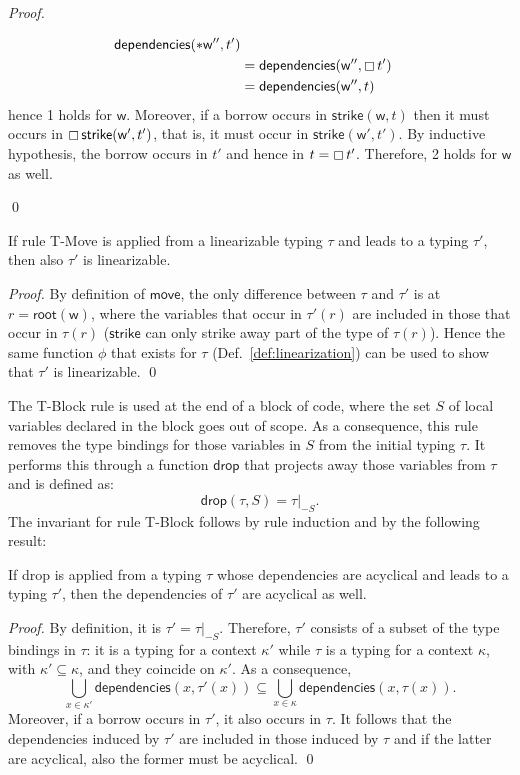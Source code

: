 \begin{proof}
\begin{itemize}
\begin{align*}
      \mathsf{dependencies}(\mathtt{*}\mathsf{w}'',t')\\
      &=\mathsf{dependencies}(\mathsf{w}'',\boxempty\,{t'})\\
      &=\mathsf{dependencies}(\mathsf{w}'',t)
    \end{align*}
    hence 1 holds for $\mathsf{w}$. Moreover, if a borrow occurs in
    $\mathsf{strike}(\mathsf{w},t)$ then it must occurs
    in $\boxempty\,{\mathsf{strike}(\mathsf{w}',t')}$, that is, it must occur in
    $\mathsf{strike}(\mathsf{w}',t')$. By inductive hypothesis, the borrow
    occurs in $t'$ and hence in $t=\boxempty\,{t'}$. Therefore, 2 holds for
    $\mathsf{w}$ as well.
  \end{itemize}
  \qed
\end{proof}

\begin{lemma}\label{lem:move_invariant}
  If rule \textsf{T-Move} is applied from a linearizable typing $\tau$
  and leads to a typing $\tau'$, then also $\tau'$ is linearizable.
\end{lemma}
\begin{proof}
  By definition of $\mathsf{move}$, the only
  difference between $\tau$ and $\tau'$ is at $r=\mathsf{root}(\mathsf{w})$,
  where the variables that occur in $\tau'(r)$ are included in those that occur
  in $\tau(r)$ ($\mathsf{strike}$ can only strike away part of the type of $\tau(r)$).
  Hence the same function $\phi$ that exists for $\tau$ (Def.~\ref{def:linearization})
  can be used to show that $\tau'$ is linearizable.
  \qed
\end{proof}

The \textsf{T-Block} rule is used at the end of a block of code, where the set $S$ of local
variables declared in the block goes out of scope. As a consequence, this rule removes
the type bindings for those variables in $S$ from the initial typing $\tau$. It performs this
through a function $\mathsf{drop}$ that projects away those variables from $\tau$ and is defined as:
\[
\mathsf{drop}(\tau,S)=\tau|_{-S}.
\]
The invariant for rule \textsf{T-Block} follows by rule induction and by the following result:
%
\begin{lemma}\label{lem:drop_invariant}
  If \textsf{drop} is applied from a typing $\tau$ whose dependencies
  are acyclical and leads to a typing $\tau'$, then the dependencies
  of $\tau'$ are acyclical as well.
\end{lemma}
\begin{proof}
  By definition, it is $\tau'=\tau|_{-S}$. Therefore, $\tau'$ consists of a subset of the
  type bindings in $\tau$: it is a typing for a context $\kappa'$ while $\tau$ is a
  typing for a context $\kappa$, with $\kappa'\subseteq\kappa$, and they coincide
  on $\kappa'$. As a consequence,
  \[
  \bigcup\limits_{x\in\kappa'}\mathsf{dependencies}(x,\tau'(x))\subseteq
  \bigcup\limits_{x\in\kappa}\mathsf{dependencies}(x,\tau(x)).
  \]
  Moreover, if a borrow occurs in $\tau'$, it also occurs in $\tau$. It follows
  that the dependencies induced by $\tau'$ are included in those induced by $\tau$
  and if the latter are acyclical, also the former must be acyclical.
  \qed
\end{proof}

